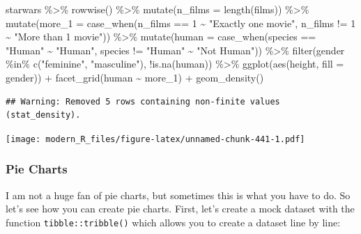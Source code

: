 \documentclass[
]{article}
\newenvironment{Shaded}{\begin{snugshade}}{\end{snugshade}}
\newcommand{\AttributeTok}[1]{\textcolor[rgb]{0.77,0.63,0.00}{#1}}
\newcommand{\DecValTok}[1]{\textcolor[rgb]{0.00,0.00,0.81}{#1}}
\newcommand{\FunctionTok}[1]{\textcolor[rgb]{0.00,0.00,0.00}{#1}}
\newcommand{\NormalTok}[1]{#1}
\newcommand{\SpecialCharTok}[1]{\textcolor[rgb]{0.00,0.00,0.00}{#1}}
\newcommand{\StringTok}[1]{\textcolor[rgb]{0.31,0.60,0.02}{#1}}
\begin{document}
\begin{Shaded}
\begin{Highlighting}[]
\NormalTok{starwars }\SpecialCharTok{\%\textgreater{}\%}
  \FunctionTok{rowwise}\NormalTok{() }\SpecialCharTok{\%\textgreater{}\%}
  \FunctionTok{mutate}\NormalTok{(}\AttributeTok{n\_films =} \FunctionTok{length}\NormalTok{(films)) }\SpecialCharTok{\%\textgreater{}\%}
  \FunctionTok{mutate}\NormalTok{(}\AttributeTok{more\_1 =} \FunctionTok{case\_when}\NormalTok{(n\_films }\SpecialCharTok{==} \DecValTok{1} \SpecialCharTok{\textasciitilde{}} \StringTok{"Exactly one movie"}\NormalTok{,}
\NormalTok{                            n\_films }\SpecialCharTok{!=} \DecValTok{1} \SpecialCharTok{\textasciitilde{}} \StringTok{"More than 1 movie"}\NormalTok{)) }\SpecialCharTok{\%\textgreater{}\%}
  \FunctionTok{mutate}\NormalTok{(}\AttributeTok{human =} \FunctionTok{case\_when}\NormalTok{(species }\SpecialCharTok{==} \StringTok{"Human"} \SpecialCharTok{\textasciitilde{}} \StringTok{"Human"}\NormalTok{,}
\NormalTok{                           species }\SpecialCharTok{!=} \StringTok{"Human"} \SpecialCharTok{\textasciitilde{}} \StringTok{"Not Human"}\NormalTok{)) }\SpecialCharTok{\%\textgreater{}\%}
  \FunctionTok{filter}\NormalTok{(gender }\SpecialCharTok{\%in\%} \FunctionTok{c}\NormalTok{(}\StringTok{"feminine"}\NormalTok{, }\StringTok{"masculine"}\NormalTok{), }\SpecialCharTok{!}\FunctionTok{is.na}\NormalTok{(human)) }\SpecialCharTok{\%\textgreater{}\%}
  \FunctionTok{ggplot}\NormalTok{(}\FunctionTok{aes}\NormalTok{(height, }\AttributeTok{fill =}\NormalTok{ gender)) }\SpecialCharTok{+}
  \FunctionTok{facet\_grid}\NormalTok{(human }\SpecialCharTok{\textasciitilde{}}\NormalTok{ more\_1) }\SpecialCharTok{+}
  \FunctionTok{geom\_density}\NormalTok{()}
\end{Highlighting}
\end{Shaded}

\begin{verbatim}
## Warning: Removed 5 rows containing non-finite values (stat_density).
\end{verbatim}

\texttt{[image: modern\_R\_files/figure-latex/unnamed-chunk-441-1.pdf]}

\hypertarget{pie-charts}{%
\subsubsection{Pie Charts}\label{pie-charts}}

I am not a huge fan of pie charts, but sometimes this is what you have to do. So let's see how you
can create pie charts.
First, let's create a mock dataset with the function \texttt{tibble::tribble()} which allows you to create a
dataset line by line:
\end{document}
